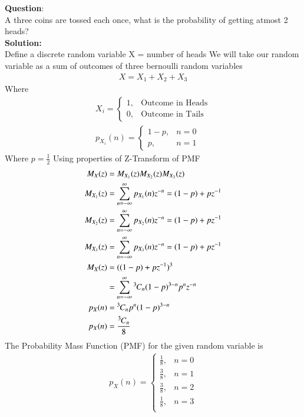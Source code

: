 \documentclass[journal]{IEEEtran}
\begin{document}
\textbf{Question}:\\
A three coins are tossed each once, what is the probability of getting atmost 2 heads?
\\
\textbf{Solution: }\\
Define a discrete random variable X = number of heads\newline
We will take our random variable as a sum of outcomes of three bernoulli random variables
\begin{align}
	X = X_1+X_2+X_3
\end{align}
Where
\begin{align}
X_i = 
\begin{cases}
	1, & \text{Outcome in Heads}\\
	0, & \text{Outcome in Tails}
\end{cases}\\
p_{X_i}(n) = 
\begin{cases}
	1-p, & n = 0\\
	p, & n = 1
\end{cases}
\end{align}
Where $p=\frac{1}{2}$\newline
Using properties of Z-Transform of PMF
\begin{align}
	M_X(z) &= M_{X_1}(z)M_{X_2}(z)M_{X_3}(z)\\
	M_{X_1}(z) &= \sum_{n=-\infty}^{\infty}p_{X_1}(n)z^{-n} = (1-p)+pz^{-1}\\
	M_{X_2}(z) &= \sum_{n=-\infty}^{\infty}p_{X_2}(n)z^{-n} = (1-p)+pz^{-1}\\
	M_{X_3}(z) &= \sum_{n=-\infty}^{\infty}p_{X_3}(n)z^{-n} = (1-p)+pz^{-1}\\
	M_X(z) &= ((1-p)+pz^{-1})^3\\
	 &= \sum_{n=-\infty}^{\infty}{{}^{3}\mkern-1muC_{n}}(1-p)^{3-n}p^nz^{-n}\\
	p_{X}(n) &= {{}^{3}\mkern-1muC_{n}}p^{n}(1-p)^{3-n}\\
	p_{X}(n) &= \frac{{{}^{3}\mkern-1muC_{n}}}{8}
\end{align}
The Probability Mass Function (PMF) for the given random variable is
\begin{align}
p_X(n) =
\begin{cases}
	\frac{1}{8}, & n = 0 \\
	\frac{3}{8}, & n = 1 \\
	\frac{3}{8}, & n = 2 \\
	\frac{1}{8}, & n = 3 \\
\end{cases}
\end{align}
\end{document}
